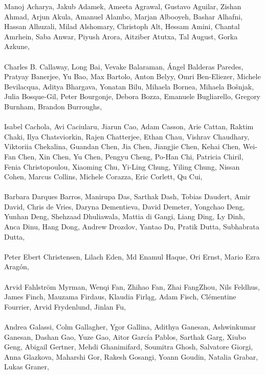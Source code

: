 \documentclass[11pt]{article}
\newcommand{\aclitem}[1][]{\item[#1:\vspace{2mm}]}
\begin{document}
\begin{description}[itemsep=4mm, style=nextline]
\aclitem[Secondary Reviewers]
Manoj Acharya, 
Jakub Adamek, 
Ameeta Agrawal, 
Gustavo Aguilar, 
Zishan Ahmad, 
Arjun Akula, 
Amanuel Alambo, 
Marjan Albooyeh, 
Bashar Alhafni, 
Hassan Alhuzali, 
Milad Alshomary, 
Christoph Alt, 
Hessam Amini, 
Chantal Amrhein, 
Saba Anwar, 
Piyush Arora, 
Aitziber Atutxa, 
Tal August, 
Gorka Azkune,
\\
\\
Charles B. Callaway, 
Long Bai, 
Vevake Balaraman, 
Ángel Balderas Paredes, 
Pratyay Banerjee, 
Yu Bao, 
Max Bartolo, 
Anton Belyy, 
Omri Ben-Eliezer, 
Michele Bevilacqua, 
Aditya Bhargava, 
Yonatan Bilu, 
Mihaela Bornea, 
Mihaela Bošnjak, 
Julia Bosque-Gil, 
Peter Bourgonje, 
Debora Bozza, 
Emanuele Bugliarello, 
Gregory Burnham, 
Brandon Burroughs, 
\\
\\
Isabel Cachola, 
Avi Caciularu, 
Jiarun Cao, 
Adam Casson, 
Arie Cattan, 
Raktim Chaki, 
Ilya Chatsviorkin, 
Rajen Chatterjee, 
Ethan Chau, 
Vishrav Chaudhary, 
Viktoriia Chekalina, 
Guandan Chen, 
Jia Chen, 
Jiangjie Chen, 
Kehai Chen, 
Wei-Fan Chen, 
Xin Chen, 
Yu Chen, 
Pengyu Cheng, 
Po-Han Chi, 
Patricia Chiril, 
Fenia Christopoulou, 
Xiaoming Chu, 
Yi-Ling Chung, 
Yiling Chung, 
Nissan Cohen, 
Marcus Collins, 
Michele Corazza, 
Eric Corlett, 
Qu Cui, 
\\
\\
Barbara Darques Barros, 
Manirupa Das, 
Sarthak Dash, 
Tobias Daudert, 
Amir David, 
Chris de Vries, 
Daryna Dementieva, 
David Demeter, 
Yongchao Deng, 
Yunhan Deng, 
Shehzaad Dhuliawala, 
Mattia di Gangi, 
Liang Ding, 
Ly Dinh, 
Anca Dinu, 
Hang Dong, 
Andrew Drozdov, 
Yantao Du, 
Pratik Dutta, 
Subhabrata Dutta, 
\\
\\
Peter Ebert Christensen, 
Lilach Eden, 
Md Enamul Haque, 
Ori Ernst, 
Mario Ezra Aragón, 
\\
\\
Arvid Fahlström Myrman, 
Wenqi Fan, 
Zhihao Fan, 
Zhai FangZhou, 
Nils Feldhus, 
James Finch, 
Mauzama Firdaus, 
Klaudia Firląg, 
Adam Fisch, 
Clémentine Fourrier, 
Arvid Frydenlund, 
Jinlan Fu, 
\\
\\
Andrea Galassi, 
Colm Gallagher, 
Ygor Gallina, 
Adithya Ganesan, 
Ashwinkumar Ganesan, 
Dashan Gao, 
Yuze Gao, 
Aitor García Pablos, 
Sarthak Garg, 
Xiubo Geng, 
Abigail Gertner, 
Mehdi Ghanimifard, 
Soumitra Ghosh, 
Salvatore Giorgi, 
Anna Glazkova, 
Maharshi Gor, 
Rakesh Gosangi, 
Yoann Goudin, 
Natalia Grabar, 
Lukas Graner, 

\end{description}
\end{document}
